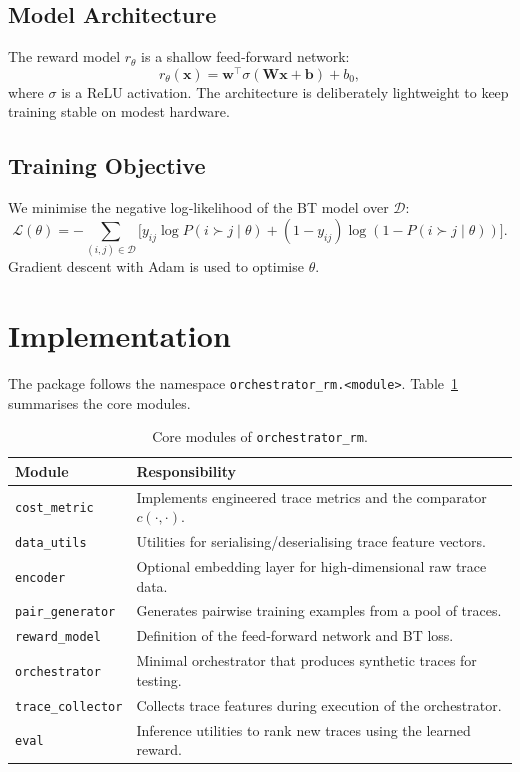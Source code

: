 \documentclass[11pt,a4paper]{article}
\begin{document}
\subsection{Model Architecture}
The reward model $r_\theta$ is a shallow feed‑forward network:
\[
r_\theta(\mathbf{x}) = \mathbf{w}^\top \sigma(\mathbf{W}\mathbf{x} + \mathbf{b}) + b_0,
\]
where $\sigma$ is a ReLU activation.  The architecture is deliberately lightweight to keep training stable on modest hardware.

\subsection{Training Objective}
We minimise the negative log‑likelihood of the BT model over $\mathcal{D}$:
\[
\mathcal{L}(\theta) = -\sum_{(i,j) \in \mathcal{D}} \bigl[ y_{ij}\log P(i \succ j \mid \theta) + (1-y_{ij})\log (1-P(i \succ j \mid \theta)) \bigr].
\]
Gradient descent with Adam \cite{kingma2014adam} is used to optimise $\theta$.

\section{Implementation}
The package follows the namespace \texttt{orchestrator\_rm.<module>}.  Table~\ref{tab:modules} summarises the core modules.

\begin{table}[h]
\centering
\begin{tabular}{ll}
\toprule
Module & Responsibility \\
\midrule
\texttt{cost\_metric} & Implements engineered trace metrics and the comparator $c(\cdot,\cdot)$. \\
\texttt{data\_utils} & Utilities for serialising/deserialising trace feature vectors. \\
\texttt{encoder} & Optional embedding layer for high‑dimensional raw trace data. \\
\texttt{pair\_generator} & Generates pairwise training examples from a pool of traces. \\
\texttt{reward\_model} & Definition of the feed‑forward network and BT loss. \\
\texttt{orchestrator} & Minimal orchestrator that produces synthetic traces for testing. \\
\texttt{trace\_collector} & Collects trace features during execution of the orchestrator. \\
\texttt{eval} & Inference utilities to rank new traces using the learned reward. \\
\bottomrule
\end{tabular}
\caption{Core modules of \texttt{orchestrator\_rm}.}
\label{tab:modules}
\end{table}
\end{document}
